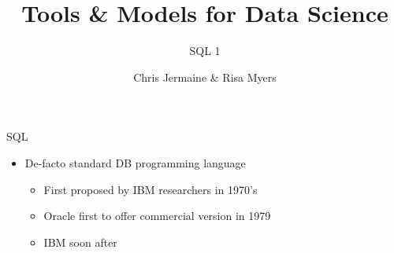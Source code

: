 \documentclass[aspectratio=169]{beamer}
\title[]
{Tools \& Models for Data Science}
\subtitle{SQL 1}
\author[]{Chris Jermaine \& Risa Myers}
\institute
{
  Rice University
}
\date[]{}
\newenvironment{noindentitemize}
{ \begin{itemize}
 \setlength{\itemsep}{1.5ex}
  \setlength{\parsep}{0pt}   
  \setlength{\parskip}{0pt}
 \addtolength{\leftskip}{-2em}
 }
{ \end{itemize} }
\newenvironment{noindentitemize2}
{ \begin{itemize}
  \setlength{\itemsep}{0ex}
  \setlength{\parskip}{0pt}
  \setlength{\parsep}{0pt}   
  \addtolength{\leftskip}{-2em}  }
{ \end{itemize} }
\begin{document}
		
\begin{frame}
 \titlepage
\end{frame}


\begin{frame}{SQL}

\begin{noindentitemize}
\item De-facto standard DB programming language
	\begin{noindentitemize2}
	\item First proposed by IBM researchers in 1970's
	\item Oracle first to offer commercial version in 1979
	\item IBM soon after
	\end{noindentitemize2}
\end{noindentitemize}
\end{frame}
\end{document}
